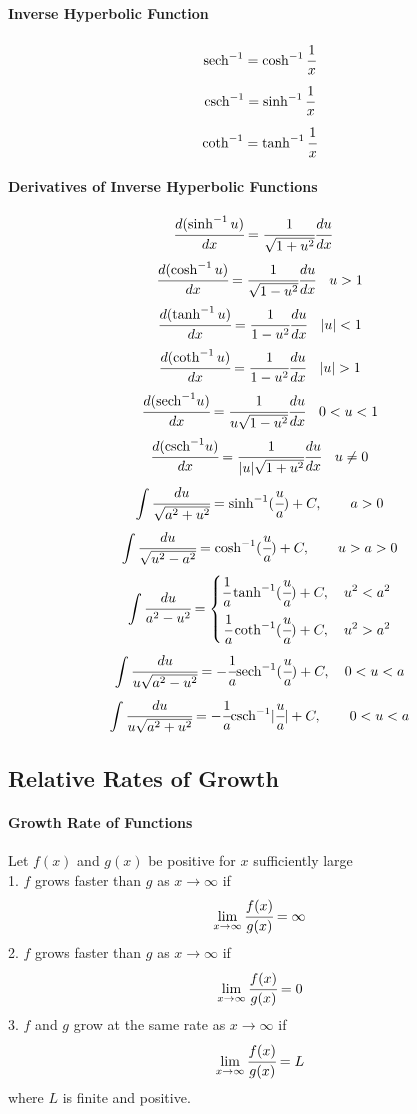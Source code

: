 \documentclass{article}
\begin{document}
            \paragraph{Inverse Hyperbolic Function}
                \[\text{sech}^{-1}=\cosh^{-1}\cfrac{1}{x}\]
                \[\text{csch}^{-1}=\sinh^{-1}\cfrac{1}{x}\]
                \[\coth^{-1}=\tanh^{-1}\cfrac{1}{x}\]
            \paragraph{Derivatives of Inverse Hyperbolic Functions}
                \[\cfrac{d(\sinh ^{-1}u)}{dx}=\cfrac{1}{\sqrt{1+u^2}}\cfrac{du}{dx}\quad\]
                \[\cfrac{d(\cosh ^{-1}u)}{dx}=\cfrac{1}{\sqrt{1-u^2}}\cfrac{du}{dx}\quad u>1\]
                \[\cfrac{d(\tanh ^{-1}u)}{dx}=\cfrac{1}{1-u^2}\cfrac{du}{dx}\quad |u|<1\]
                \[\cfrac{d(\coth ^{-1}u)}{dx}=\cfrac{1}{1-u^2}\cfrac{du}{dx}\quad |u|>1\]
                \[\cfrac{d(\text{sech} ^{-1}u)}{dx}=\cfrac{1}{u\sqrt{1-u^2}}\cfrac{du}{dx}\quad 0<u<1\]
                \[\cfrac{d(\text{csch} ^{-1}u)}{dx}=\cfrac{1}{|u|\sqrt{1+u^2}}\cfrac{du}{dx}\quad u\ne 0\]
                \[\int \cfrac{du}{\sqrt{a^2+u^2}}=\sinh ^{-1}(\cfrac{u}{a})+C,\qquad a>0\]
                \[\int \cfrac{du}{\sqrt{u^2-a^2}}=\cosh ^{-1}(\cfrac{u}{a})+C,\qquad u>a>0\]
                \[\int \cfrac{du}{a^2-u^2}=\left\{
                    \begin{aligned}
                        \cfrac{1}{a}\tanh ^{-1}(\cfrac{u}{a})+C,\quad u^2<a^2\\
                        \cfrac{1}{a}\coth ^{-1}(\cfrac{u}{a})+C,\quad u^2>a^2\\
                    \end{aligned}
                \right.\]
                \[\int \cfrac{du}{u \sqrt{a^2-u^2}}=-\cfrac{1}{a}\text{sech}^{-1}(\cfrac{u}{a})+C,\quad 0<u<a\]
                \[\int \cfrac{du}{u\sqrt{a^2+u^2}}=-\cfrac{1}{a}\text{csch}^{-1}|\cfrac{u}{a}|+C,\qquad 0<u<a\]
        \subsection{Relative Rates of Growth}
            \paragraph{Growth Rate of Functions} Let $f(x)$ and $g(x)$ be positive for $x$ sufficiently large\\
            1. $f$ grows faster than $g$ as $x\to \infty$ if
            \[\lim\limits_{x\to \infty}\cfrac{f(x)}{g(x)}=\infty\]
            2. $f$ grows faster than $g$ as $x\to \infty$ if
            \[\lim\limits_{x\to \infty}\cfrac{f(x)}{g(x)}=0\]
            3. $f$ and $g$ grow at the same rate as $x\to \infty$ if
            \[\lim\limits_{x\to \infty}\cfrac{f(x)}{g(x)}=L\]
            where $L$ is finite and positive.
\end{document}
